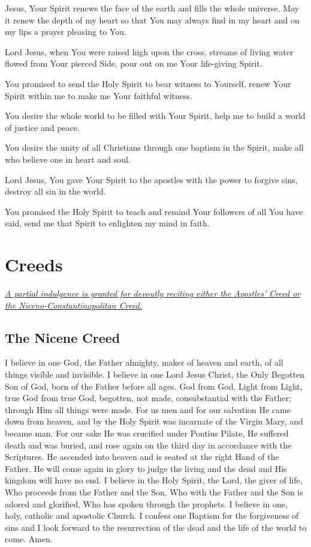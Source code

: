 \documentclass[12pt]{article}
\newcommand{\prayersection}[1]{\section{#1}}
\newcommand{\prayertitle}[1]{\subsection{#1}}
\newcommand{\indulgencedprayertitle}[1]{\prayertitle{#1 \protect\kreuz}}
\newcommand{\emphasis}[1]{\emph{#1}}
\newcommand{\emphasis}[1]{\textsl{#1}}
\newcommand{\note}[1]{{\small{\emphasis{#1}}}\newline}
\newcommand{\linkednote}[2]{\hyperlink{#1}{\note{#2}}}
\begin{document}
Jesus, Your Spirit renews the face of the earth and fills the whole universe.
May it renew the depth of my heart so that You may always find in my heart and on my lips a prayer pleasing to You.

Lord Jesus, when You were raised high upon the cross, streams of living water flowed from Your pierced Side, pour out on me Your life-giving Spirit.

You promised to send the Holy Spirit to bear witness to Yourself, renew Your Spirit within me to make me Your faithful witness.

You desire the whole world to be filled with Your Spirit, help me to build a world of justice and peace.

You desire the unity of all Christians through one baptism in the Spirit, make all who believe one in heart and soul.

Lord Jesus, You gave Your Spirit to the apostles with the power to forgive sins, destroy all sin in the world.

You promised the Holy Spirit to teach and remind Your followers of all You have said, send me that Spirit to enlighten my mind in faith.

\newpage

\prayersection{Creeds}
\linkednote{grant28}{A partial indulgence is granted for devoutly reciting either the Apostles' Creed or the Niceno-Constantinopolitan Creed.}
\indulgencedprayertitle{The Nicene Creed}
I believe in one God, the Father almighty, maker of heaven and earth, of all things visible and invisible.
I believe in one Lord Jesus Christ, the Only Begotten Son of God, born of the Father before all ages.
God from God, Light from Light, true God from true God, begotten, not made, consubstantial with the Father;
through Him all things were made.
For us men and for our salvation He came down from heaven, and by the Holy Spirit was incarnate of the Virgin Mary, and became man.
For our sake He was crucified under Pontius Pilate, He suffered death and was buried, and rose again on the third day in accordance with the Scriptures.
He ascended into heaven and is seated at the right Hand of the Father.
He will come again in glory to judge the living and the dead and His kingdom will have no end.
I believe in the Holy Spirit, the Lord, the giver of life, Who proceeds from the Father and the Son, Who with the Father and the Son is adored and glorified, Who has spoken through the prophets.
I believe in one, holy, catholic and apostolic Church.
I confess one Baptism for the forgiveness of sins and I look forward to the resurrection of the dead and the life of the world to come.
Amen.
\end{document}
